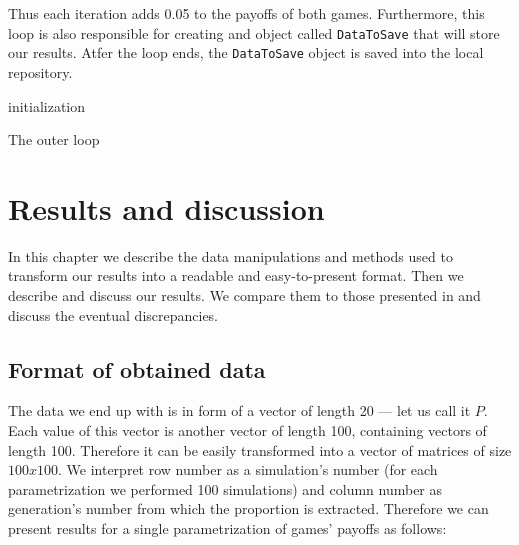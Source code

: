 \documentclass[english, twoside, 12pt, a4paper]{article}
\theoremstyle{definition}
\theoremstyle{plain}
\theoremstyle{remark}
\begin{document}
 Thus each iteration adds 0.05 to the payoffs of both games. Furthermore, this loop is also responsible for creating and object called \lstinline+DataToSave+ that will store our results. Atfer the loop ends, the \lstinline+DataToSave+ object is saved into the local repository.
 
 \begin{algorithm}[H]
  initialization\;
  \caption{The outer loop}
 \end{algorithm}
 
\clearpage
\section{Results and discussion}

In this chapter we describe the data manipulations and methods used to transform our results into a readable and easy-to-present format. Then we describe and discuss our results. We compare them to those presented in \cite{santos2005scale} and discuss the eventual discrepancies. 

\subsection{Format of obtained data}

The data we end up with is in form of a vector of length 20 --- let us call it $P$. Each value of this vector is another vector of length 100, containing vectors of length 100. Therefore it can be easily transformed into a vector of matrices of size $100 x 100$. We interpret row number as a simulation's number (for each parametrization we performed 100 simulations) and column number as generation's number from which the proportion is extracted. Therefore we can present results for a single parametrization of games' payoffs as follows:
\end{document}
